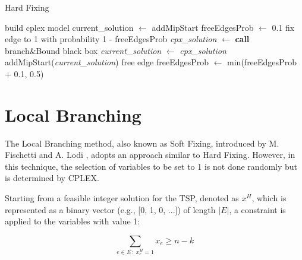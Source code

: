 \begin{algorithm}[H]
    \caption{Hard Fixing}
    \label{alg:hard_fixing}
    \begin{spacing}{1.2} %
        \BlankLine
        build cplex model\;
        current\_solution $\leftarrow$ addMipStart\;
        freeEdgesProb $\leftarrow$ 0.1\;
        \BlankLine
        {
            {
                {
                    fix edge to 1 with probability 1 - freeEdgesProb\;
                }
            }
            \BlankLine\BlankLine
            \textit{cpx\_solution} $\leftarrow$ \textbf{call} branch\&Bound black box\;
            \BlankLine\BlankLine
            {
                \textit{current\_solution} $\leftarrow$ \textit{cpx\_solution}\;
                addMipStart(\textit{current\_solution})\;
            }
            \BlankLine
            {
                free edge\;
            }
            \BlankLine
            {
                freeEdgesProb $\leftarrow$ min(freeEdgesProb + 0.1, 0.5)\;
            }
        }
    \end{spacing}
\end{algorithm}

\section{Local Branching}
\label{chap:local_branching}

The Local Branching method, also known as Soft Fixing, introduced by M. Fischetti and A. Lodi \cite{Fischetti2003}, adopts an approach similar to Hard Fixing. However, in this technique, the selection of variables to be set to 1 is not done randomly but is determined by CPLEX.

\newpage

\noindent Starting from a feasible integer solution for the TSP, denoted as \(x^H\), which is represented as a binary vector (e.g., [0, 1, 0, ...]) of length \(|E|\), a constraint is applied to the variables with value 1:

\begin{equation}
    \sum_{e \in E\ :\ x_{e}^{H} = 1} x_e \geq n - k
    \label{eq:loc_fix_2}
\end{equation}

